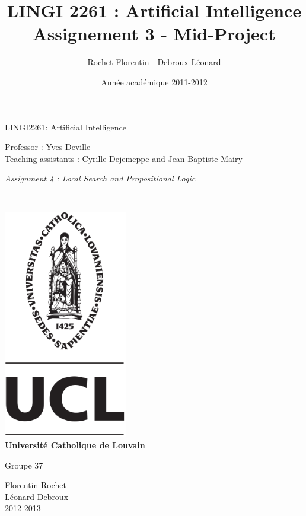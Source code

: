 \documentclass[a4paper,10pt]{article}
\title{LINGI 2261 : Artificial Intelligence \\
Assignement 3 - Mid-Project}
\author{Rochet Florentin - Debroux Léonard}
\date{Année académique 2011-2012}
\begin{document}
	\begin{titlepage}
		\begin{center}
			{\huge LINGI2261: Artificial Intelligence}\\
			\vspace{0.4cm}
			
			{\Large {Professor : Yves Deville\\ \vspace{0.2cm} Teaching assistants : Cyrille Dejemeppe and Jean-Baptiste Mairy  }}\\
			\vspace{0.6cm}
			
			{\Large \textit{Assignment 4 : Local Search and Propositional Logic}}\\
			\vspace{1.2cm}

			\texttt{}\\
			\vspace{0.2cm}

			\includegraphics[height=10cm]{pageGarde.png}\\
			\vspace{0.1cm}
			{\Large \textbf{Universit\'e Catholique de Louvain}}
			\vspace{0.7cm}

			Groupe 37 \\
			\vspace{0.2cm}
			
			Florentin Rochet \\
			Léonard Debroux\\
			\vspace{0.2cm}
			2012-2013\\
		\end{center}
	\end{titlepage}
\end{document}

